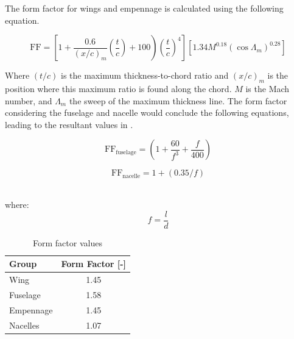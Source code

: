 The form factor for wings and empennage is calculated using the following equation.

\begin{equation}
\left.\mathrm{FF}=\left[1+\frac{0.6}{(x / c)_m}\left(\frac{t}{c}\right)+100\right)\left(\frac{t}{c}\right)^4\right]\left[1.34 M^{0.18}\left(\cos \Lambda_m\right)^{0.28}\right]
\end{equation}

Where $(t/c)$ is the maximum thickness-to-chord ratio
and $(x/c)_m$ is the position where this maximum ratio is found along the chord.
$M$ is the Mach number, and $\Lambda_m$ the sweep of the maximum thickness line.
The form factor considering the fuselage and nacelle would conclude the following equations, leading to the resultant values in .

\begin{minipage}[H]{.5\linewidth}
\begin{equation}
    \mathrm{FF}_\text{fuselage}=\left(1+\frac{60}{f^3}+\frac{f}{400}\right)
\end{equation}
\end{minipage}%
\begin{minipage}{.5\linewidth}
\begin{equation}
    \mathrm{FF}_\text{nacelle} = 1 + (0.35/f)
\end{equation}
\end{minipage}\\
where:
\begin{equation}
    f = \frac{l}{d}
\end{equation}

\begin{table}[H]
    \centering
    \caption{Form factor values}
    \label{tab:Form Factor}
    \begin{tabular}{l|S[table-format=1.2]}
        \toprule
        \textbf{Group}       & \textbf{Form Factor} [{-}]      \\ \midrule
        Wing        & 1.45             \\
        Fuselage    & 1.58             \\
        Empennage   & 1.45             \\
        Nacelles    & 1.07             \\\bottomrule
    \end{tabular}
\end{table}



